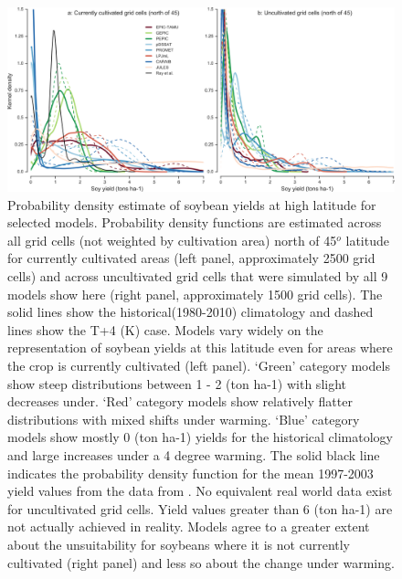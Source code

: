 \documentclass[gmd, manuscript]{copernicus} %
\begin{document}
\begin{figure}[ht]
\centering
   \includegraphics[width=15cm]{figures/soy_highlats.png}
\caption{Probability density estimate of soybean yields at high latitude for selected models. 
  Probability density functions are estimated across all grid cells (not weighted by cultivation area) north of 45$^o$ latitude for currently cultivated areas (left panel, approximately 2500 grid cells) and across uncultivated grid cells that were simulated by all 9 models show here (right panel, approximately 1500 grid cells). 
  The solid lines show the historical(1980-2010) climatology and dashed lines show the T+4 (K) case.
  Models vary widely on the representation of soybean yields at this latitude even for areas where the crop is currently cultivated (left panel).
  `Green' category models show steep distributions between 1 - 2 (ton ha-1) with slight decreases under. 
  `Red' category models show relatively flatter distributions with mixed shifts under warming. 
  `Blue' category models show mostly 0 (ton ha-1) yields for the historical climatology and large increases under a 4 degree warming. 
  The solid black line indicates the probability density function for the mean 1997-2003 yield values from the data from \cite{Ray2012}. 
  No equivalent real world data exist for uncultivated grid cells.
  Yield values greater than 6 (ton ha-1) are not actually achieved in reality. 
  Models agree to a greater extent about the unsuitability for soybeans where it is not currently cultivated (right panel) and less so about the change under warming.
}
\label{fig:highlat}
\end{figure}
\end{document}
